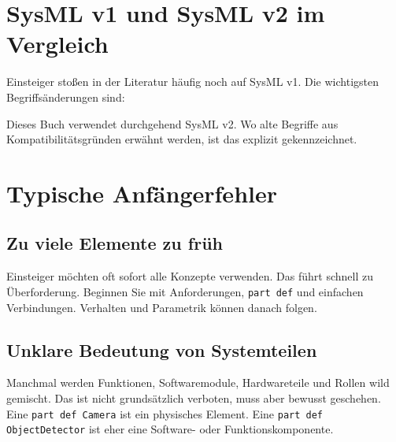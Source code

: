 \section{SysML v1 und SysML v2 im Vergleich}
Einsteiger stoßen in der Literatur häufig noch auf SysML v1. Die wichtigsten Begriffsänderungen sind:

\begin{center}
\end{center}

Dieses Buch verwendet durchgehend SysML v2. Wo alte Begriffe aus Kompatibilitätsgründen erwähnt werden, ist das explizit gekennzeichnet.

\section{Typische Anfängerfehler}
\subsection{Zu viele Elemente zu früh}
Einsteiger möchten oft sofort alle Konzepte verwenden. Das führt schnell zu Überforderung. Beginnen Sie mit Anforderungen, \texttt{part def} und einfachen Verbindungen. Verhalten und Parametrik können danach folgen.

\subsection{Unklare Bedeutung von Systemteilen}
Manchmal werden Funktionen, Softwaremodule, Hardwareteile und Rollen wild gemischt. Das ist nicht grundsätzlich verboten, muss aber bewusst geschehen. Eine \texttt{part def Camera} ist ein physisches Element. Eine \texttt{part def ObjectDetector} ist eher eine Software- oder Funktionskomponente.

